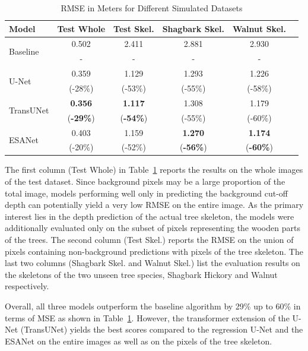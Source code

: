 \begin{table}[!ht]
\caption{RMSE in Meters for Different Simulated Datasets}
\label{tab:res_simulation_percent}
\begin{tabular}{@{}p{1.15cm}|ccccc@{}}
\toprule
Model & Test Whole & Test Skel. & Shagbark Skel. & Walnut Skel. \\
\hline \hline
\multirow{2}{*}{Baseline} & 0.502 & 2.411 & 2.881 & 2.930 \\
&\phantom{iiii}- & \phantom{iiii}- &\phantom{iiii}- & \phantom{iiii}- \\ \hline
\multirow{2}{*}{U-Net} & 0.359 & 1.129 &  1.293 & 1.226 \\
& (-28\%) & (-53\%) & (-55\%) &  (-58\%) \\ \hline
\multirow{2}{*}{TransUNet} & \textbf{0.356} & \textbf{1.117} & 1.308 & 1.179 \\
& (\textbf{-29\%}) & (\textbf{-54\%}) &  (-55\%) &  (-60\%) \\ \hline
\multirow{2}{*}{ESANet} & 0.403 &  1.159 & \textbf{1.270} & \textbf{1.174} \\
& (-20\%) & (-52\%) & (\textbf{-56\%}) & (\textbf{-60\%}) \\ \bottomrule
\end{tabular}
\end{table}


The first column (Test Whole) in Table~\ref{tab:res_simulation_percent} reports the results on the whole images of the test dataset. Since background pixels may be a large proportion of the total image, models performing well only in predicting the background cut-off depth can potentially yield a very low RMSE on the entire image. As the primary interest lies in the depth prediction of the actual tree skeleton, the models were additionally evaluated only on the subset of pixels representing the wooden parts of the trees. The second column (Test Skel.) reports the RMSE on the union of pixels containing non-background predictions with pixels of the tree skeleton. The last two columns (Shagbark Skel. and Walnut Skel.) list the evaluation results on the skeletons of the two unseen tree species, Shagbark Hickory and Walnut respectively. 

Overall, all three models outperform the baseline algorithm by 29\% up to 60\% in terms of MSE as shown in Table~\ref{tab:res_simulation_percent}. However, the transformer extension of the U-Net (TransUNet) yields the best scores compared to the regression U-Net and the ESANet on the entire images as well as on the pixels of the tree skeleton.

